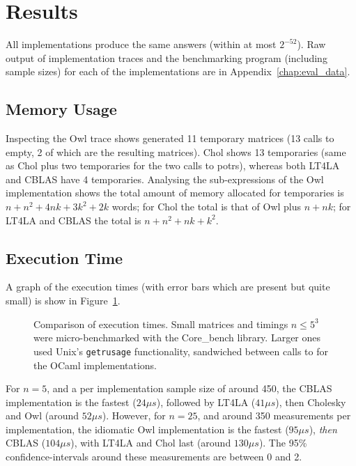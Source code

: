 \section{Results}

All implementations produce the same answers (within at most $2^{-52}$). Raw
output of implementation traces and the benchmarking program (including sample
sizes) for each of the implementations are in Appendix~\ref{chap:eval_data}.

\subsection{Memory Usage}

Inspecting the Owl trace shows generated 11 temporary matrices (13 calls to
empty, 2 of which are the resulting matrices). Chol shows 13 temporaries (same
as Chol plus two temporaries for the two calls to potrs), whereas both LT4LA
and CBLAS have 4 temporaries. Analysing the sub-expressions of the Owl
implementation shows the total amount of memory allocated for temporaries is $n
+ n^2 + 4nk + 3k^2 + 2k$ words; for Chol the total is that of Owl plus $n +
nk$; for LT4LA and CBLAS the total is $n + n^2 + nk + k^2$.

\subsection{Execution Time}

A graph of the execution times (with error bars which are present but quite
small) is show in Figure~\ref{fig:timings}.

\begin{figure}[tp]
    \centering
    
    \caption{Comparison of execution times. Small matrices and timings $n \le
        5^3$ were micro-benchmarked with the Core\_bench library. Larger ones used
        Unix's \texttt{getrusage} functionality, sandwiched between calls to
         for the OCaml implementations.}\label{fig:timings}

\end{figure}

For $n=5$, and a per implementation sample size of around 450, the CBLAS
implementation is the fastest ($24\mu s$), followed by LT4LA ($41 \mu s$), then
Cholesky and Owl (around $52 \mu s$).  However, for $n=25$, and around 350
measurements per implementation, the idiomatic Owl implementation is the fastest
($95 \mu s$), \emph{then} CBLAS ($104 \mu s$), with LT4LA and Chol last (around
$130 \mu s$). The 95\% confidence-intervals around these measurements are
between 0 and 2.

